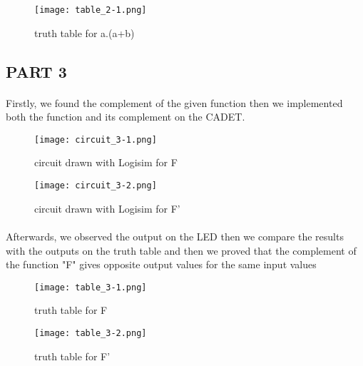\documentclass[pdftex,12pt,a4paper]{article}
\begin{document}
\begin{figure}[H]
    \centering
    \texttt{[image: table\_2-1.png]}
	\caption{truth table for a.(a+b)}
	\label{tbl3}
\end{figure}




\begin{flushleft}
\subsection{PART 3}
\end{flushleft}
\begin{flushleft}
\paragraph{}
Firstly, we found the complement of the given function then  we implemented both the function and its complement on the CADET.
\end{flushleft}

\begin{figure}[H]
    \centering
	\texttt{[image: circuit\_3-1.png]}
	\caption{circuit drawn with Logisim for F}
	\label{fig4}
\end{figure}
\begin{figure}[H]
    \centering
	\texttt{[image: circuit\_3-2.png]}
	\caption{circuit drawn with Logisim for F'}
	\label{fig5}
\end{figure}

\begin{flushleft} %
\paragraph{}
Afterwards, we observed the output on the LED then we compare the results with the outputs on the truth table and then we proved that the complement of the  function "F"  gives opposite output values for the same input values
\end{flushleft}
\begin{figure}[H]
    \centering
	\texttt{[image: table\_3-1.png]}
	\caption{truth table for F}
	\label{tbl4}
\end{figure}
\begin{figure}[H]
    \centering
	\texttt{[image: table\_3-2.png]}
	\caption{truth table for F'}
	\label{tbl5}
\end{figure}
\end{document}
